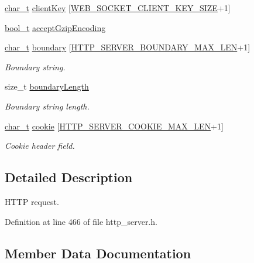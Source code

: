 \begin{DoxyCompactItemize}
\item 
\hyperlink{compiler__port_8h_a40bb5262bf908c328fbcfbe5d29d0201}{char\+\_\+t} \hyperlink{structHttpRequest_a99055e13726e27634f85c3ea7a78fe9b}{client\+Key} \mbox{[}\hyperlink{web__socket_8h_aec52a37b246082418c0b6dbf0235e99d}{W\+E\+B\+\_\+\+S\+O\+C\+K\+E\+T\+\_\+\+C\+L\+I\+E\+N\+T\+\_\+\+K\+E\+Y\+\_\+\+S\+I\+ZE}+1\mbox{]}
\item 
\hyperlink{compiler__port_8h_a812d16e5494522586b3784e55d479912}{bool\+\_\+t} \hyperlink{structHttpRequest_ab19d56d5fe98ebf9ea9060bac0dea6a6}{accept\+Gzip\+Encoding}
\item 
\hyperlink{compiler__port_8h_a40bb5262bf908c328fbcfbe5d29d0201}{char\+\_\+t} \hyperlink{structHttpRequest_a4c8fdacc57d38db41fd0006662b75fb9}{boundary} \mbox{[}\hyperlink{http__server_8h_a1ecbcd512cdc74212d1ab9c4c8c8edde}{H\+T\+T\+P\+\_\+\+S\+E\+R\+V\+E\+R\+\_\+\+B\+O\+U\+N\+D\+A\+R\+Y\+\_\+\+M\+A\+X\+\_\+\+L\+EN}+1\mbox{]}
\begin{DoxyCompactList}\small\item\em Boundary string. \end{DoxyCompactList}\item 
size\+\_\+t \hyperlink{structHttpRequest_aa8e24c0fb310c7b008bf6379601ac1da}{boundary\+Length}
\begin{DoxyCompactList}\small\item\em Boundary string length. \end{DoxyCompactList}\item 
\hyperlink{compiler__port_8h_a40bb5262bf908c328fbcfbe5d29d0201}{char\+\_\+t} \hyperlink{structHttpRequest_a81615817f1f0d2b48595f6c33b33d541}{cookie} \mbox{[}\hyperlink{http__server_8h_ad5dfb8361753ec3dc34f805ed450fc4e}{H\+T\+T\+P\+\_\+\+S\+E\+R\+V\+E\+R\+\_\+\+C\+O\+O\+K\+I\+E\+\_\+\+M\+A\+X\+\_\+\+L\+EN}+1\mbox{]}
\begin{DoxyCompactList}\small\item\em Cookie header field. \end{DoxyCompactList}\end{DoxyCompactItemize}


\subsection{Detailed Description}
H\+T\+TP request. 

Definition at line 466 of file http\+\_\+server.\+h.



\subsection{Member Data Documentation}
\mbox{\label{structHttpRequest_ab19d56d5fe98ebf9ea9060bac0dea6a6}} 
